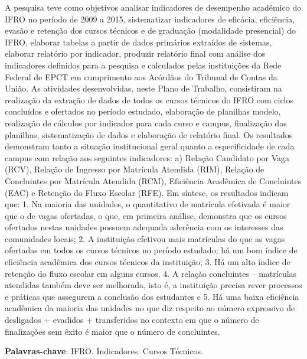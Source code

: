 \documentclass[article,12pt,onesidea,4paper,english,brazil]{abntex2}
\begin{document}
	\noindent A pesquisa teve como objetivos analisar indicadores de desempenho
	acadêmico do IFRO no período de 2009 a 2015, sistematizar indicadores de
	eficácia, eficiência, evasão e retenção dos cursos técnicos e de graduação
	(modalidade presencial) do IFRO, elaborar tabelas a partir de dados primários
	extraídos de sistemas, elaborar relatório por indicador, produzir relatório final com
	análise dos indicadores definidos para a pesquisa e calculados pelas instituições da
	Rede Federal de EPCT em cumprimento aos Acórdãos do Tribunal de Contas da
	União. As atividades desenvolvidas, neste Plano de Trabalho, consistiram na
	realização da extração de dados de todos os cursos técnicos do IFRO com ciclos
	concluídos e ofertados no período estudado, elaboração de planilhas modelo,
	realização de cálculos por indicador para cada curso e campus, finalização das
	planilhas, sistematização de dados e elaboração de relatório final. Os resultados
	demonstram tanto a situação institucional geral quanto a especificidade de cada
	campus com relação aos seguintes indicadores: a) Relação Candidato por Vaga
	(RCV), Relação de Ingresso por Matrícula Atendida (RIM), Relação de Concluintes
	por Matrícula Atendida (RCM), Eficiência Acadêmica de Concluintes (EAC) e
	Retenção do Fluxo Escolar (RFE). Em síntese, os resultados indicam que: 1. Na
	maioria das unidades, o quantitativo de matrícula efetivada é maior que o de vagas
	ofertadas, o que, em primeira análise, demonstra que os cursos ofertados nestas
	unidades possuem adequada aderência com os interesses das comunidades locais;
	2. A instituição efetivou mais matrículas do que as vagas ofertadas em todos os
	cursos técnicos no período estudado; há um bom índice de eficiência acadêmica dos
	cursos técnicos da instituição; 3. Há um alto índice de retenção do fluxo escolar em
	alguns cursos. 4. A relação concluintes – matrículas atendidas também deve ser
	melhorada, isto é, a instituição precisa rever processos e práticas que assegurem a
	conclusão dos estudantes e 5. Há uma baixa eficiência acadêmica da maioria das
	unidades no que diz respeito ao número expressivo de desligados + evadidos +
	transferidos no contexto em que o número de finalizações sem êxito é maior que o
	número de concluintes.
	
	\vspace{\onelineskip}
	
	\noindent
	\textbf{Palavras-chave}: IFRO. Indicadores. Cursos Técnicos.
	
\end{document}
